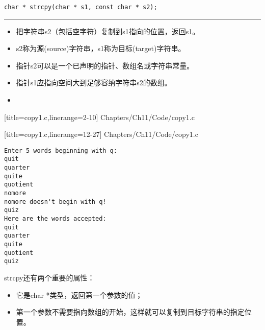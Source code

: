 \begin{frame}[fragile] 
\begin{lstlisting}[title=strcpy函数原型, basicstyle=\ttfamily]
char * strcpy(char * s1, const char * s2);
\end{lstlisting}
\rule{\textwidth}{0.3mm} \vspace{0.3mm}

\begin{itemize}
\item 
{}把字符串s2（包括空字符）复制到s1指向的位置，返回s1。\\[0.1in]
\item
s2称为源(source)字符串，s1称为目标(target)字符串。
\\[0.1in]
\item
指针s2可以是一个已声明的指针、数组名或字符串常量。\\[0.1in]
\item
指针s1应指向空间大到足够容纳字符串s2的数组。\\[0.1in]
\item[]
\end{itemize}
\end{frame}

\begin{frame}[fragile]

[title=copy1.c,linerange={2-10}]
{Chapters/Ch11/Code/copy1.c}

\end{frame}

\begin{frame}[fragile]

[title=copy1.c,linerange={12-27}]
{Chapters/Ch11/Code/copy1.c}
\end{frame}

\begin{frame}[fragile]
\begin{lstlisting}[basicstyle=\ttfamily]
Enter 5 words beginning with q:
quit
quarter
quite
quotient
nomore
nomore doesn't begin with q!
quiz
Here are the words accepted:
quit
quarter
quite
quotient
quiz
\end{lstlisting}

\end{frame}

\begin{frame}[fragile] 
strcpy还有两个重要的属性：\vspace{0.1in}
\begin{itemize}
\item 它是char *类型，返回第一个参数的值； \\[0.1in]
\item 第一个参数不需要指向数组的开始，这样就可以复制到目标字符串的指定位置。
\end{itemize}
\end{frame}

